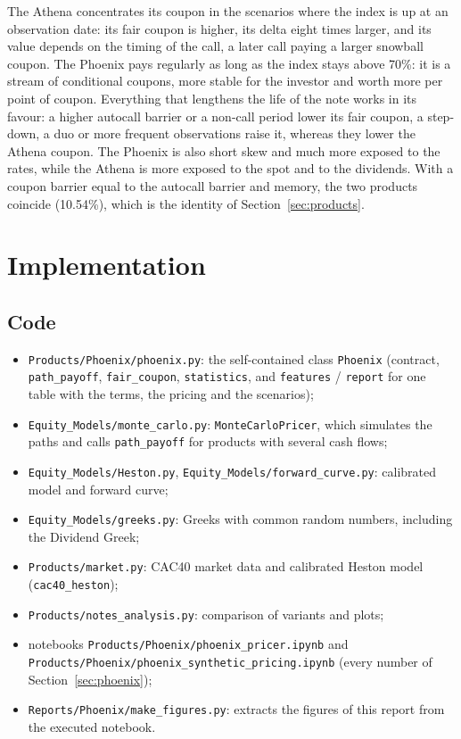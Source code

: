 \documentclass[11pt,a4paper]{article}
\newcommand{\code}[1]{\texttt{#1}}
\begin{document}
The Athena concentrates its coupon in the scenarios where the index is up at an observation date: its fair coupon is
higher, its delta eight times larger, and its value depends on the timing of the call, a later call paying a larger
snowball coupon. The Phoenix pays regularly as long as the index stays above 70\%: it is a stream of conditional
coupons, more stable for the investor and worth more per point of coupon. Everything that lengthens the life of the
note works in its favour: a higher autocall barrier or a non-call period lower its fair coupon, a step-down, a duo or
more frequent observations raise it, whereas they lower the Athena coupon. The Phoenix is also short skew and much
more exposed to the rates, while the Athena is more exposed to the spot and to the dividends. With a coupon barrier
equal to the autocall barrier and memory, the two products coincide (10.54\%), which is the identity of
Section~\ref{sec:products}.

\section{Implementation}\label{sec:implementation}

\subsection{Code}
\begin{itemize}
\item \code{Products/Phoenix/phoenix.py}: the self-contained class \code{Phoenix} (contract, \code{path\_payoff},
\code{fair\_coupon}, \code{statistics}, and \code{features} / \code{report} for one table with the terms, the
pricing and the scenarios);
\item \code{Equity\_Models/monte\_carlo.py}: \code{MonteCarloPricer}, which simulates the paths and calls
\code{path\_payoff} for products with several cash flows;
\item \code{Equity\_Models/Heston.py}, \code{Equity\_Models/forward\_curve.py}: calibrated model and forward curve;
\item \code{Equity\_Models/greeks.py}: Greeks with common random numbers, including the Dividend Greek;
\item \code{Products/market.py}: CAC40 market data and calibrated Heston model (\code{cac40\_heston});
\item \code{Products/notes\_analysis.py}: comparison of variants and plots;
\item notebooks \code{Products/Phoenix/phoenix\_pricer.ipynb} and\\
\code{Products/Phoenix/phoenix\_synthetic\_pricing.ipynb} (every number of Section~\ref{sec:phoenix});
\item \code{Reports/Phoenix/make\_figures.py}: extracts the figures of this report from the executed notebook.
\end{itemize}
\end{document}
